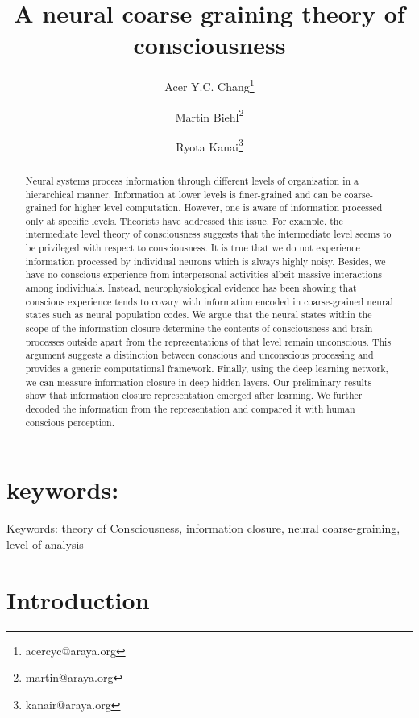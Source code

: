 \documentclass[utf8]{article}
\title{A neural coarse graining theory of consciousness}
\author[1]{Acer Y.C. Chang\thanks{acercyc@araya.org}}
\author[1]{Martin Biehl\thanks{martin@araya.org}}
\author[1]{Ryota Kanai\thanks{kanair@araya.org }}
\affil[1]{ARAYA, Inc., Tokyo, Japan}
\begin{document}
	\maketitle
	\tableofcontents
	
	\begin{abstract}
		Neural systems process information through different levels of organisation in a hierarchical manner. Information at lower levels is finer-grained and can be coarse-grained for higher level computation. However, one is aware of information processed only at specific levels. Theorists have addressed this issue. For example, the intermediate level theory of consciousness suggests that the intermediate level seems to be privileged with respect to consciousness. It is true that we do not experience information processed by individual neurons which is always highly noisy. Besides, we have no conscious experience from interpersonal activities albeit massive interactions among individuals. Instead, neurophysiological evidence has been showing that conscious experience tends to covary with information encoded in coarse-grained neural states such as neural population codes. We argue that the neural states within the scope of the information closure determine the contents of consciousness and brain processes outside apart from the representations of that level remain unconscious. This argument suggests a distinction between conscious and unconscious processing and provides a generic computational framework. Finally, using the deep learning network, we can measure information closure in deep hidden layers. Our preliminary results show that information closure representation emerged after learning. We further decoded the information from the representation and compared it with human conscious perception.
	\end{abstract}
	
	
	\section*{keywords:} 
	Keywords: theory of Consciousness, information closure, neural coarse-graining, level of analysis
	
	
	
	\section{Introduction}
	
\end{document}
